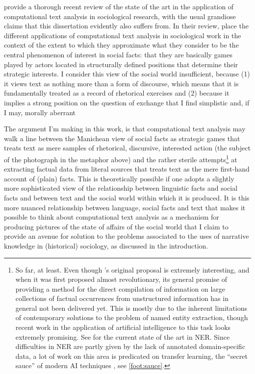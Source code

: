 \citet{evans2016} provide a thorough recent review of the state of the art in the application of computational text analysis in sociological research, with the usual grandiose claims that this dissertation evidently also suffers from.
In their review, \citeauthor{evans2016} place the different applications of computational text analysis in sociological work in the context of the extent to which they approximate what they consider to be the central phenomenon of interest in social facts: that they are basically games played by actors located in structurally defined positions that determine their strategic interests.
I consider this view of the social world insufficient, because (1) it views text as nothing more than a form of discourse, which means that it is fundamentally treated as a record of rhetorical exercises and (2) because it implies a strong position on the question of exchange that I find simplistic and, if I may, morally aberrant

The argument I'm making in this work, is that computational text analysis may walk a line between the Manichean view of social facts as strategic games that treats text as mere samples of rhetorical, discursive, interested action (the subject of the photograph in the metaphor above) and the rather sterile attempts\footnote{
    So far, at least. Even though \citeauthor{franzosi2004}'s original proposal is extremely interesting, and when it was first proposed almost revolutionary, its general promise of providing a method for the direct compilation of information on large collections of factual occurrences from unstructured information has in general not been delivered yet.
    This is mostly due to the inherent limitations of contemporary solutions to the problem of named entity extraction, though recent work in the application of artificial intelligence to this task looks extremely promising.
    See \citet{huang2015,strubell2017} for the current state of the art in NER.
    Since difficulties in NER are partly given by the lack of annotated domain-specific data, a lot of work on this area is predicated on transfer learning, the ``secret sauce'' of modern AI techniques \citep{luong2013}, see \autoref{foot:sauce}.
} at extracting factual data from literal sources that treats text as the mere first-hand account of (plain) facts.
This is theoretically possible if one adopts a slightly more sophisticated view of the relationship between linguistic facts and social facts and between text and the social world within which it is produced.
It is this more nuanced relationship between language, social facts and text that makes it possible to think about computational text analysis as a mechanism for producing pictures of the state of affairs of the social world that I claim to provide an avenue for solution to the problems associated to the uses of narrative knowledge in (historical) sociology, as discussed in the introduction.

